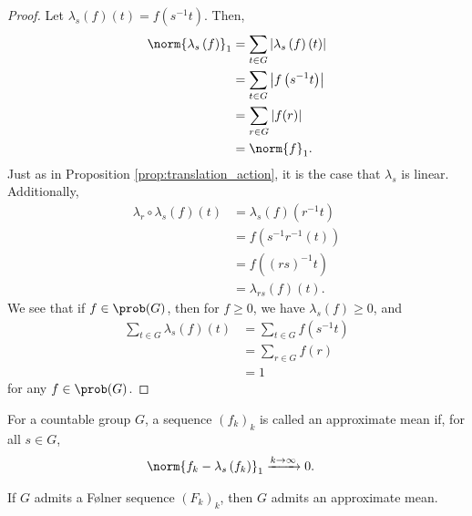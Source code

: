 \begin{proof}
  Let $\lambda_s\left(f\right)\left(t\right) = f\left(s^{-1}t\right)$. Then,
  \begin{align*}
    \norm{\lambda_s\left(f\right)}_1 &= \sum_{t\in G}\left\vert \lambda_s\left(f\right)\left(t\right) \right\vert\\
                                     &= \sum_{t\in G}\left\vert f\left(s^{-1}t\right) \right\vert\\
                                     &= \sum_{r\in G}\left\vert f(r) \right\vert\\
                                     &= \norm{f}_{1}.
  \end{align*}
  Just as in Proposition \ref{prop:translation_action}, it is the case that $\lambda_s$ is linear. Additionally,
  \begin{align*}
    \lambda_r\circ \lambda_s\left(f\right)\left(t\right) &= \lambda_s\left(f\right)\left(r^{-1}t\right)\\
                                                         &= f\left(s^{-1}r^{-1}\left(t\right)\right)\\
                                                         &= f\left(\left(rs\right)^{-1}t\right)\\
                                                         &= \lambda_{rs}\left(f\right)\left(t\right).
  \end{align*}
  We see that if $f\in \prob(G)$, then for $f\geq 0$, we have $\lambda_s\left(f\right) \geq 0$, and
  \begin{align*}
    \sum_{t\in G}\lambda_s\left(f\right)\left(t\right) &= \sum_{t\in G}f\left(s^{-1}t\right)\\
                                                       &= \sum_{r\in G}f\left(r\right)\\
                                                       &= 1
  \end{align*}
  for any $f\in \prob(G)$.
\end{proof}
\begin{definition}
  For a countable group $G$, a sequence $\left(f_k\right)_k$ is called an {approximate mean} if, for all $s\in G$,
  \begin{align*}
    \norm{f_k - \lambda_s\left(f_k\right)}_{1} &\xrightarrow{k\rightarrow \infty}0.
  \end{align*}
\end{definition}
\begin{proposition}
  If $G$ admits a Følner sequence $\left(F_k\right)_k$, then $G$ admits an approximate mean.
\end{proposition}
